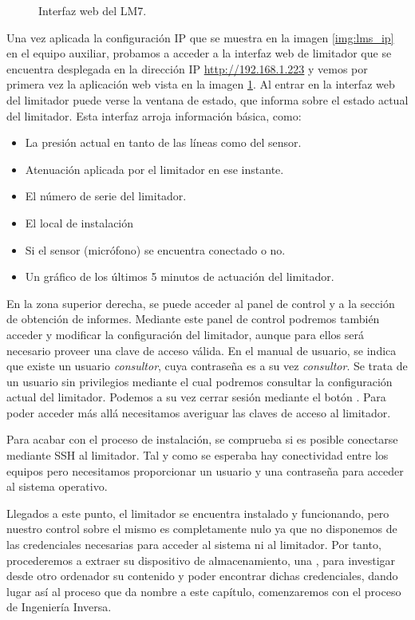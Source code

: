 \begin{figure}[ht]
\begin{minipage}[t]{.45\textwidth}
        \caption{Interfaz web del \acrshort{LM7}.}
        \label{img:lms_ui}
    \end{minipage}
\end{figure}

Una vez aplicada la configuración \acrshort{IP} que se muestra en la imagen \ref{img:lms_ip} en el equipo auxiliar, probamos a acceder a la interfaz web de limitador que se encuentra desplegada en la dirección \acrshort{IP}
\href{http://192.168.1.223}{http://192.168.1.223} y vemos por primera vez la aplicación web vista en la imagen \ref{img:lms_ui}. Al entrar en la interfaz web del limitador puede verse la ventana de estado, que informa sobre el estado actual del limitador. Esta interfaz arroja información básica, como:

\begin{itemize}
    \item La presión actual en  tanto de las líneas como del sensor.
    \item Atenuación aplicada por el limitador en ese instante.
    \item El número de serie del limitador.
    \item El local de instalación
    \item Si el sensor (micrófono) se encuentra conectado o no.
    \item Un gráfico de los últimos 5 minutos de actuación del limitador.
\end{itemize}

En la zona superior derecha, se puede acceder al panel de control y a la sección de obtención de informes. Mediante este panel de control podremos también acceder y modificar la configuración del limitador, aunque para ellos será necesario proveer una clave de acceso válida. En el manual de usuario, se indica que existe un usuario \textit{consultor}, cuya contraseña es a su vez \textit{consultor}. Se trata de un usuario sin privilegios mediante el cual podremos consultar la configuración actual del limitador. Podemos a su vez cerrar sesión mediante el botón . Para poder acceder más allá necesitamos averiguar las claves de acceso al limitador.

Para acabar con el proceso de instalación, se comprueba si es posible conectarse mediante \acrshort{SSH} al limitador. Tal y como se esperaba hay conectividad entre los equipos pero necesitamos proporcionar un usuario y una contraseña para acceder al sistema operativo.

Llegados a este punto, el limitador se encuentra instalado y funcionando, pero nuestro control sobre el mismo es completamente nulo ya que no disponemos de las credenciales necesarias para acceder al sistema ni al limitador. Por tanto, procederemos a extraer su dispositivo de almacenamiento, una , para investigar desde otro ordenador su contenido y poder encontrar dichas credenciales, dando lugar así al proceso que da nombre a este capítulo, comenzaremos con el proceso de Ingeniería Inversa.

